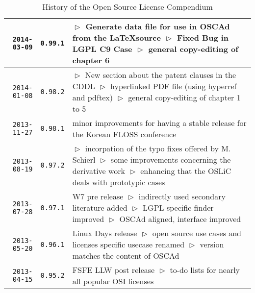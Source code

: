 \begin{table}
\footnotesize
\caption{History of the Open Source License Compendium}
\begin{center}
\begin{tabular}{|r|c|p{9.4cm}|}
\hline
\hline
    \texttt{2014-03-09}
  & \texttt{0.99.1}
  & $\vartriangleright$ Generate data file for use in OSCAd from the \LaTeX source\newline
  $\vartriangleright$ Fixed Bug in LGPL C9 Case \newline
  $\vartriangleright$ general copy-editing of chapter 6\\
\hline
    \texttt{2014-01-08}
  & \texttt{0.98.2}
  & $\vartriangleright$ New section about the patent clauses in the CDDL\newline
  $\vartriangleright$ hyperlinked PDF file (using hyperref and pdftex)\newline
  $\vartriangleright$ general copy-editing of chapter 1 to 5\\
\hline
    \texttt{2013-11-27}
  & \texttt{0.98.1}
  & minor improvements for having a stable release for the Korean FLOSS
  conference\\
\hline
    \texttt{2013-08-19}
  & \texttt{0.97.2}
  & $\vartriangleright$ incorpation of the typo fixes offered by M.
    Schierl\newline
  $\vartriangleright$ some improvements concerning the derivative work\newline
  $\vartriangleright$ enhancing that the OSLiC deals with prototypic cases\\
\hline
    \texttt{2013-07-28}
  & \texttt{0.97.1} 
  & W7 pre release\newline
    $\vartriangleright$ indirectly used secondary literature added\newline
    $\vartriangleright$ LGPL specific finder improved\newline
    $\vartriangleright$ OSCAd aligned, interface improved\\
\hline
    \texttt{2013-05-20}
  & \texttt{0.96.1} 
  & Linux Days release\newline    
    $\vartriangleright$ open source use cases and licenses specific usecase renamed\newline
    $\vartriangleright$ version matches the content of OSCAd\\
\hline
    \texttt{2013-04-15}
  & \texttt{0.95.2} 
  & FSFE LLW post release\newline
    $\vartriangleright$ to-do lists for nearly all popular OSI licenses\newline

\end{tabular}
\end{center}
\end{table}
